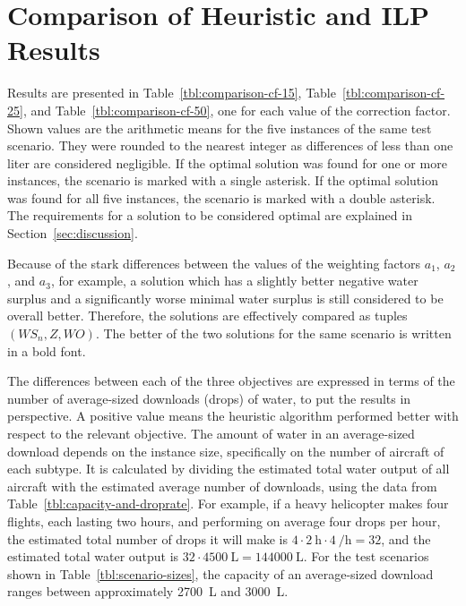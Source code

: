 \section{Comparison of Heuristic and ILP Results}

Results are presented in Table~\ref{tbl:comparison-cf-15}, Table~\ref{tbl:comparison-cf-25}, and Table~\ref{tbl:comparison-cf-50}, one for each value of the correction factor.
Shown values are the arithmetic means for the five instances of the same test scenario.
They were rounded to the nearest integer as differences of less than one liter are considered negligible.
If the optimal solution was found for one or more instances, the scenario is marked with a single asterisk.
If the optimal solution was found for all five instances, the scenario is marked with a double asterisk.
The requirements for a solution to be considered optimal are explained in Section~\ref{sec:discussion}.

Because of the stark differences between the values of the weighting factors $a_1$, $a_2$, and $a_3$, for example, a solution which has a slightly better negative water surplus and a significantly worse minimal water surplus is still considered to be overall better.
Therefore, the solutions are effectively compared as tuples $(\!\mathit{WS_n}, \mathit{Z}, \mathit{WO})$.
The better of the two solutions for the same scenario is written in a bold font.

The differences between each of the three objectives are expressed in terms of the number of average-sized downloads (drops) of water, to put the results in perspective.
A positive value means the heuristic algorithm performed better with respect to the relevant objective.
The amount of water in an average-sized download depends on the instance size, specifically on the number of aircraft of each subtype.
It is calculated by dividing the estimated total water output of all aircraft with the estimated average number of downloads, using the data from Table~\ref{tbl:capacity-and-droprate}.
For example, if a heavy helicopter makes four flights, each lasting two hours, and performing on average four drops per hour, the estimated total number of drops it will make is $4 \cdot \SI{2}{\hour} \cdot \SI{4}{\per\hour} = 32$, and the estimated total water output is $32 \cdot \SI{4500}{\liter} = \SI{144000}{\liter}$.
For the test scenarios shown in Table~\ref{tbl:scenario-sizes}, the capacity of an average-sized download ranges between approximately \SI{2700}{\liter} and \SI{3000}{\liter}.

